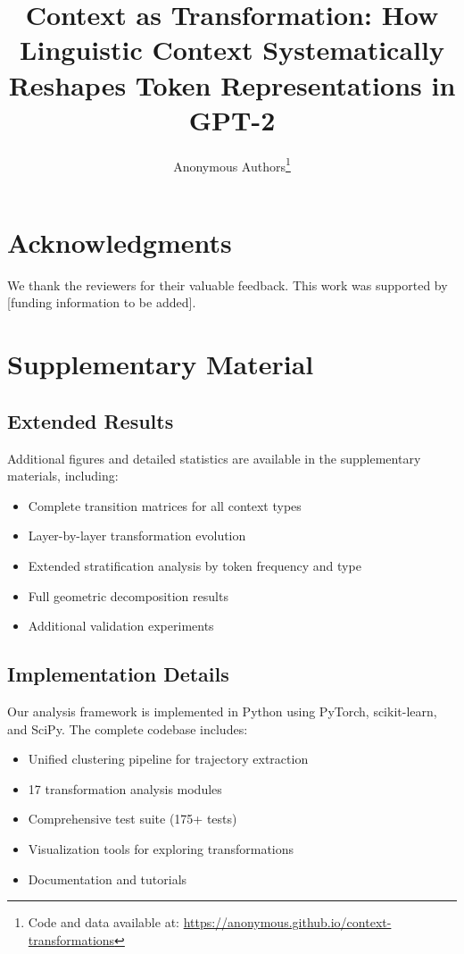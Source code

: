 \documentclass[11pt,a4paper]{article}
\title{Context as Transformation: How Linguistic Context Systematically Reshapes Token Representations in GPT-2}
\author{
  Anonymous Authors\thanks{Code and data available at: \url{https://anonymous.github.io/context-transformations}}
}
\date{}
\begin{document}
\maketitle















\section*{Acknowledgments}
We thank the reviewers for their valuable feedback. This work was supported by [funding information to be added].




\appendix
\section{Supplementary Material}

\subsection{Extended Results}
Additional figures and detailed statistics are available in the supplementary materials, including:
\begin{itemize}
    \item Complete transition matrices for all context types
    \item Layer-by-layer transformation evolution
    \item Extended stratification analysis by token frequency and type
    \item Full geometric decomposition results
    \item Additional validation experiments
\end{itemize}

\subsection{Implementation Details}
Our analysis framework is implemented in Python using PyTorch, scikit-learn, and SciPy. The complete codebase includes:
\begin{itemize}
    \item Unified clustering pipeline for trajectory extraction
    \item 17 transformation analysis modules
    \item Comprehensive test suite (175+ tests)
    \item Visualization tools for exploring transformations
    \item Documentation and tutorials
\end{itemize}
\end{document}
